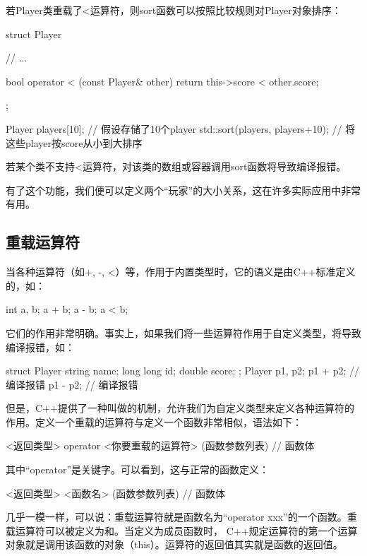 若Player类重载了<运算符，则sort函数可以按照比较规则对Player对象排序：
\begin{cppcode}
    struct Player {
        // ...

        bool operator < (const Player& other) {
            return this->score < other.score;
        }
    };

    Player players[10]; // 假设存储了10个player
    std::sort(players, players+10); // 将这些player按score从小到大排序
\end{cppcode}

若某个类不支持<运算符，对该类的数组或容器调用sort函数将导致编译报错。

有了这个功能，我们便可以定义两个“玩家”的大小关系，这在许多实际应用中非常有用。

\subsection*{重载运算符}
当各种运算符（如+, -, <）等，作用于内置类型时，它的语义是由C++标准定义的，如：
\begin{cppcode}
    int a, b;
    a + b;
    a - b;  
    a < b;
\end{cppcode}
它们的作用非常明确。事实上，如果我们将一些运算符作用于自定义类型，将导致编译报错，如：
\begin{cppcode}
    struct Player {
        string name;
        long long id;
        double score;   
    };
    Player p1, p2;
    p1 + p2;    // 编译报错
    p1 - p2;    // 编译报错
\end{cppcode}
但是，C++提供了一种叫做的机制，允许我们为自定义类型来定义各种运算符的作用。定义一个重载的运算符与定义一个函数非常相似，语法如下：
\begin{cppcode}
    <返回类型> operator <你要重载的运算符> (函数参数列表) {
        // 函数体
    }
\end{cppcode}

其中“operator”是关键字。可以看到，这与正常的函数定义：
\begin{cppcode}
    <返回类型> <函数名>                   (函数参数列表) {
        // 函数体
    }
\end{cppcode}
几乎一模一样，可以说：重载运算符就是函数名为“operator xxx”的一个函数。重载运算符可以被定义为和。当定义为成员函数时，
C++规定运算符的第一个运算对象就是调用该函数的对象（this）。运算符的返回值其实就是函数的返回值。

